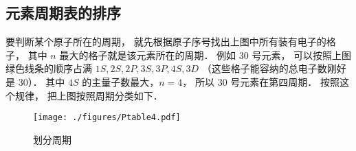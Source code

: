 \subsection{元素周期表的排序}

要判断某个原子所在的周期， 就先根据原子序号找出上图中所有装有电子的格子， 其中 $n$ 最大的格子就是该元素所在的周期． 例如 30 号元素， 可以按照上图绿色线条的顺序占满 $1S, 2S, 2P, 3S, 3P, 4S, 3D$ （这些格子能容纳的总电子数刚好是 30）． 其中 $4S$ 的主量子数最大，$n=4$， 所以 30 号元素在第四周期． 按照这个规律， 把上图按照周期分类如下．
\begin{figure}[ht]
\centering
\texttt{[image: ./figures/Ptable4.pdf]}
\caption{划分周期} 
\end{figure}

